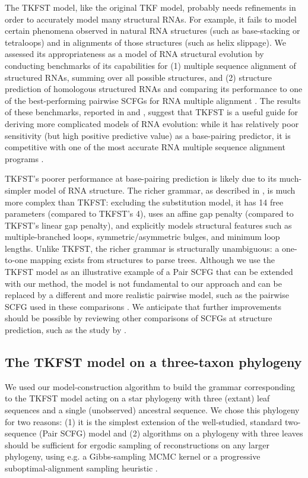 \documentclass[10pt]{article}
\begin{document}
The TKFST model, like the original TKF model, probably needs
refinements in order to accurately model many structural RNAs.  For
example, it fails to model certain phenomena observed in natural
RNA structures (such as base-stacking or tetraloops) and in alignments
of those structures (such as helix slippage).
We assessed its appropriateness as a model of RNA structural evolution
by conducting benchmarks of its capabilities for (1) multiple sequence
alignment of structured RNAs, summing over all possible structures,
and (2) structure prediction of homologous structured RNAs and
comparing its performance to one of the best-performing pairwise
SCFGs for RNA multiple alignment \cite{BradleyPachterHolmes2008}.  The
results of these benchmarks, reported in 
and , suggest that TKFST is a
useful guide for deriving more complicated models of RNA evolution:
while it has relatively poor sensitivity (but high positive predictive
value) as a base-pairing predictor, it is competitive with one of the
most accurate RNA multiple sequence alignment programs \cite{BradleyPachterHolmes2008}.

TKFST's poorer performance at base-pairing prediction is likely
due to its much-simpler model of RNA structure.
The richer grammar, as described in \cite{Holmes2005},
is much more complex than TKFST:
excluding the substitution model, it has 14 free parameters
(compared to TKFST's 4),
uses an affine gap penalty
(compared to TKFST's linear gap penalty),
and explicitly models structural features
such as multiple-branched loops, symmetric/asymmetric bulges, and minimum loop lengths.
Unlike TKFST, the richer grammar is structurally unambiguous:
a one-to-one mapping exists from structures to parse trees.
Although we use the TKFST model as an illustrative example of a Pair
SCFG that can be extended with our method, the model is not
fundamental to our approach and can be replaced by a different
and more realistic pairwise model, such as the pairwise SCFG used in 
these comparisons \cite{BradleyPachterHolmes2008}.
We anticipate that further improvements should be possible by reviewing
other comparisons of SCFGs at structure prediction,
such as the study by \cite{DowellEddy2004}.


\subsection*{The TKFST model on a three-taxon phylogeny}

We used our model-construction algorithm to build the grammar
corresponding to the TKFST model acting on a star phylogeny with three
(extant) leaf sequences and a single (unobserved) ancestral
sequence. We chose this phylogeny for two reasons: (1) it is the
simplest extension of the well-studied, standard two-sequence (Pair
SCFG) model and (2) algorithms on a phylogeny with three leaves
should be sufficient for ergodic sampling of reconstructions on any larger phylogeny,
using e.g. a Gibbs-sampling MCMC kernel \cite{JensenHein2002}
or a progressive suboptimal-alignment sampling heuristic \cite{PatenHolmesBirney2008}.
\end{document}

